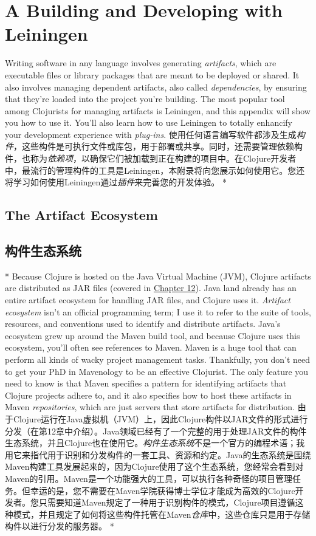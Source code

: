 \chapter{A Building and Developing with Leiningen}
\begin{paracol}{2}
Writing software in any language involves generating \emph{artifacts},
which are executable files or library packages that are meant to be
deployed or shared. It also involves managing dependent artifacts, also
called \emph{dependencies}, by ensuring that they're loaded into the
project you're building. The most popular tool among Clojurists for
managing artifacts is Leiningen, and this appendix will show you how to
use it. You'll also learn how to use Leiningen to totally enhancify your
development experience with \emph{plug-ins}.
\switchcolumn
使用任何语言编写软件都涉及生成\emph{构件}，这些构件是可执行文件或库包，用于部署或共享。同时，还需要管理依赖构件，也称为\emph{依赖项}，以确保它们被加载到正在构建的项目中。在Clojure开发者中，最流行的管理构件的工具是Leiningen，本附录将向您展示如何使用它。您还将学习如何使用Leiningen通过\emph{插件}来完善您的开发体验。
\switchcolumn[0]*
\section{The Artifact Ecosystem}
\switchcolumn
\section{构件生态系统}
\switchcolumn[0]*
Because Clojure is hosted on the Java Virtual Machine (JVM), Clojure
artifacts are distributed as JAR files (covered in
\href{javascript:void(0)}{Chapter 12}). Java land already has an entire
artifact ecosystem for handling JAR files, and Clojure uses it.
\emph{Artifact ecosystem} isn't an official programming term; I use it
to refer to the suite of tools, resources, and conventions used to
identify and distribute artifacts. Java's ecosystem grew up around the
Maven build tool, and because Clojure uses this ecosystem, you'll often
see references to Maven. Maven is a huge tool that can perform all kinds
of wacky project management tasks. Thankfully, you don't need to get
your PhD in Mavenology to be an effective Clojurist. The only feature
you need to know is that Maven specifies a pattern for identifying
artifacts that Clojure projects adhere to, and it also specifies how to
host these artifacts in Maven \emph{repositories}, which are just
servers that store artifacts for distribution.
\switchcolumn
由于Clojure运行在Java虚拟机（JVM）上，因此Clojure构件以JAR文件的形式进行分发（在第12章中介绍）。Java领域已经有了一个完整的用于处理JAR文件的构件生态系统，并且Clojure也在使用它。\emph{构件生态系统}不是一个官方的编程术语；我用它来指代用于识别和分发构件的一套工具、资源和约定。Java的生态系统是围绕Maven构建工具发展起来的，因为Clojure使用了这个生态系统，您经常会看到对Maven的引用。Maven是一个功能强大的工具，可以执行各种奇怪的项目管理任务。但幸运的是，您不需要在Maven学院获得博士学位才能成为高效的Clojure开发者。您只需要知道Maven规定了一种用于识别构件的模式，Clojure项目遵循这种模式，并且规定了如何将这些构件托管在Maven\emph{仓库}中，这些仓库只是用于存储构件以进行分发的服务器。
\switchcolumn[0]*

\end{paracol}
